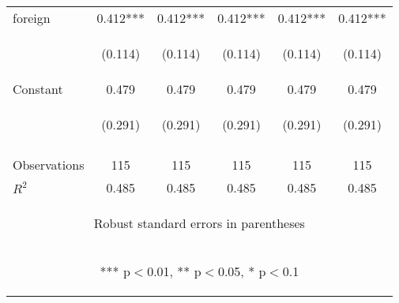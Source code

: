 \begin{center}
\begin{tabular}{lccccc}
foreign & 0.412*** & 0.412*** & 0.412*** & 0.412*** & 0.412*** \\
\vspace{4pt} & \begin{footnotesize}(0.114)\end{footnotesize} & \begin{footnotesize}(0.114)\end{footnotesize} & \begin{footnotesize}(0.114)\end{footnotesize} & \begin{footnotesize}(0.114)\end{footnotesize} & \begin{footnotesize}(0.114)\end{footnotesize} \\
Constant & 0.479 & 0.479 & 0.479 & 0.479 & 0.479 \\
 & \begin{footnotesize}(0.291)\end{footnotesize} & \begin{footnotesize}(0.291)\end{footnotesize} & \begin{footnotesize}(0.291)\end{footnotesize} & \begin{footnotesize}(0.291)\end{footnotesize} & \begin{footnotesize}(0.291)\end{footnotesize} \\
\vspace{4pt} & \begin{footnotesize}\end{footnotesize} & \begin{footnotesize}\end{footnotesize} & \begin{footnotesize}\end{footnotesize} & \begin{footnotesize}\end{footnotesize} & \begin{footnotesize}\end{footnotesize} \\
Observations & 115 & 115 & 115 & 115 & 115 \\
 $R^2$ & 0.485 & 0.485 & 0.485 & 0.485 & 0.485 \\ \hline
\multicolumn{6}{c}{\begin{footnotesize} Robust standard errors in parentheses\end{footnotesize}} \\
\multicolumn{6}{c}{\begin{footnotesize} *** p$<$0.01, ** p$<$0.05, * p$<$0.1\end{footnotesize}} \\
\end{tabular}
\end{center}
